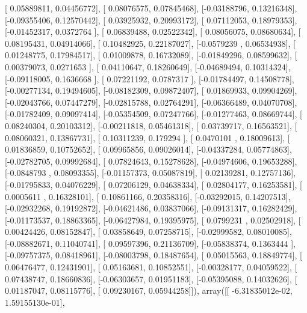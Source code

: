 \documentclass{article}
\begin{document}
       [ 0.05889811,  0.04456772],
       [ 0.08076575,  0.07845468],
       [-0.03188796,  0.13216348],
       [-0.09355406,  0.12570442],
       [ 0.03925932,  0.20993172],
       [ 0.07112053,  0.18979353],
       [-0.01452317,  0.0372764 ],
       [ 0.06839488,  0.02522342],
       [ 0.08056075,  0.08680634],
       [ 0.08195431,  0.04914066],
       [ 0.10482925,  0.22187027],
       [-0.0579239 ,  0.06534938],
       [ 0.01248775,  0.17984517],
       [ 0.01009878,  0.16732089],
       [-0.01849296,  0.08599632],
       [ 0.00379073,  0.0271653 ],
       [ 0.04110647,  0.18260649],
       [-0.04689494,  0.10314324],
       [-0.09118005,  0.1636668 ],
       [ 0.07221192,  0.0787317 ],
       [-0.01784497,  0.14508778],
       [-0.00277134,  0.19494605],
       [-0.08182309,  0.09872407],
       [ 0.01869933,  0.09904269],
       [-0.02043766,  0.07447279],
       [-0.02815788,  0.02764291],
       [-0.06366489,  0.04070708],
       [-0.01782409,  0.09097414],
       [-0.05354509,  0.07247766],
       [-0.01277463,  0.08669744],
       [ 0.08240304,  0.20103312],
       [-0.00211818,  0.05461318],
       [ 0.03739717,  0.16563521],
       [ 0.08060321,  0.13867731],
       [ 0.10311239,  0.179294  ],
       [ 0.0470101 ,  0.18009613],
       [ 0.01836859,  0.10752652],
       [ 0.09965856,  0.09026014],
       [-0.04337284,  0.05774863],
       [-0.02782705,  0.09992684],
       [ 0.07824643,  0.15278628],
       [-0.04974606,  0.19653288],
       [-0.0848793 ,  0.08093355],
       [-0.01157373,  0.05087819],
       [ 0.02139281,  0.12757136],
       [-0.01795833,  0.04076229],
       [ 0.07206129,  0.04638334],
       [ 0.02804177,  0.16253581],
       [ 0.0005611 ,  0.16328101],
       [ 0.10861166,  0.20358316],
       [-0.03292015,  0.14207513],
       [-0.02932268,  0.19192872],
       [-0.04621486,  0.03837066],
       [-0.09131317,  0.16282429],
       [-0.01173537,  0.18863365],
       [-0.06427984,  0.19395975],
       [ 0.0799231 ,  0.02502918],
       [ 0.00424426,  0.08152847],
       [ 0.03858649,  0.07258715],
       [-0.02999582,  0.08010085],
       [-0.08882671,  0.11040741],
       [ 0.09597396,  0.21136709],
       [-0.05838374,  0.1363444 ],
       [-0.09757375,  0.08418961],
       [-0.08003798,  0.18487654],
       [ 0.05015563,  0.18849774],
       [ 0.06476477,  0.12431901],
       [ 0.05163681,  0.10852551],
       [-0.00328177,  0.04059522],
       [ 0.07438747,  0.18660836],
       [-0.06303657,  0.01951183],
       [-0.05395088,  0.14032626],
       [ 0.01187047,  0.08115776],
       [ 0.09230167,  0.05944258]]), array([[ -6.31835012e-02,   1.59155130e-01],
\end{document}
